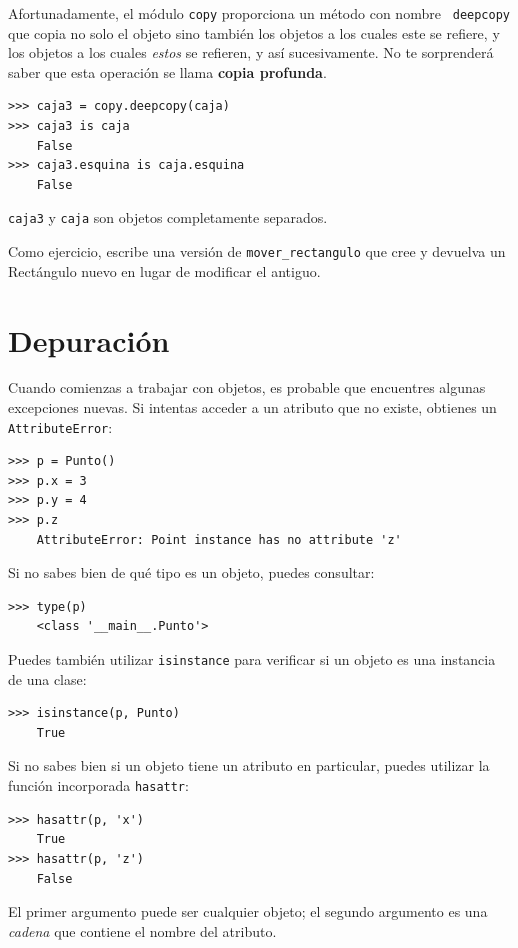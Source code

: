 \documentclass[10pt]{book}
\begin{document}
Afortunadamente, el módulo {\tt copy} proporciona un método con nombre {\tt
deepcopy} que copia no solo el objeto sino también
los objetos a los cuales este se refiere, y los objetos a los cuales {\em estos} se refieren,
y así sucesivamente.
No te sorprenderá saber que esta operación se
llama {\bf copia profunda}.

\begin{verbatim}
>>> caja3 = copy.deepcopy(caja)
>>> caja3 is caja
    False
>>> caja3.esquina is caja.esquina
    False
\end{verbatim}
%
{\tt caja3} y {\tt caja} son objetos completamente separados.

Como ejercicio, escribe una versión de \verb"mover_rectangulo" que cree y
devuelva un Rectángulo nuevo en lugar de modificar el antiguo.


\section{Depuración}
\label{hasattr}

Cuando comienzas a trabajar con objetos, es probable que encuentres
algunas excepciones nuevas.  Si intentas acceder a un atributo
que no existe, obtienes un {\tt AttributeError}:

\begin{verbatim}
>>> p = Punto()
>>> p.x = 3
>>> p.y = 4
>>> p.z
    AttributeError: Point instance has no attribute 'z'
\end{verbatim}
%
Si no sabes bien de qué tipo es un objeto, puedes consultar:

\begin{verbatim}
>>> type(p)
    <class '__main__.Punto'>
\end{verbatim}
%
Puedes también utilizar {\tt isinstance} para verificar si un objeto
es una instancia de una clase:

\begin{verbatim}
>>> isinstance(p, Punto)
    True
\end{verbatim}
%
Si no sabes bien si un objeto tiene un atributo en particular,
puedes utilizar la función incorporada {\tt hasattr}:

\begin{verbatim}
>>> hasattr(p, 'x')
    True
>>> hasattr(p, 'z')
    False
\end{verbatim}
%
El primer argumento puede ser cualquier objeto; el segundo argumento es una {\em
cadena} que contiene el nombre del atributo.
\end{document}

